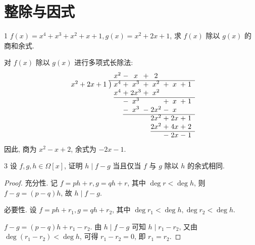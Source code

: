 
\renewcommand{\thesection}{1.3}

\section{整除与因式}\label{sec:1.3}

\begin{ex}{1}\label{ex:1.3.1}
    \(f(x)=x^4+x^3+x^2+x+1,g(x)=x^2+2x+1\), 求 \(f(x)\) 除以 \(g(x)\) 的商和余式.
\end{ex}

\begin{solution}
    对 \(f(x)\) 除以 \(g(x)\) 进行多项式长除法:
    \[
    \begin{array}{r @{\;} l @{\;} c @{\;} c @{\;} c @{\;} c @{\;} c @{\;} c @{\;} c @{\;} c @{\;} c}
        & & x^2 & - & x & + & 2 & & & & \\
        \cline{2-11}
        x^2+2x+1 & \big) & x^4 & + & x^3 & + & x^2 & + & x & + & 1 \\
        & & x^4 & + & 2x^3 & + & x^2 & & & & \\
        \cline{3-11}
        & & & - & x^3 & & & + & x & + & 1 \\
        & & & - & x^3 & - & 2x^2 & - & x & & \\
        \cline{4-11}
        & & & & & & 2x^2 & + & 2x & + & 1 \\
        & & & & & & 2x^2 & + & 4x & + & 2 \\
        \cline{7-11}
        & & & & & & & - & 2x & - & 1
    \end{array}
    \]
    因此, 商为 \(x^2-x+2\), 余式为 \(-2x-1\).
\end{solution}

\begin{ex}{3}\label{ex:1.3.3}
    设 \(f,g,h\in\Omega[x]\), 证明 \(h\mid f-g\) 当且仅当 \(f\) 与 \(g\) 除以 \(h\) 的余式相同.
\end{ex}

\begin{proof}
    充分性. 记 \(f=ph+r,g=qh+r\), 其中 \(\deg r<\deg h\), 则 \(f-g=(p-q)h\), 故 \(h\mid f-g\).
    
    必要性. 设 \(f=ph+r_1,g=qh+r_2\), 其中 \(\deg r_1<\deg h,\deg r_2<\deg h\).

    \(f-g=(p-q)h+r_1-r_2\). 由 \(h\mid f-g\) 可知 \(h\mid r_1-r_2\),
    又由 \(\deg(r_1-r_2)<\deg h\), 可得 \(r_1-r_2=0\), 即 \(r_1=r_2\).
\end{proof}

